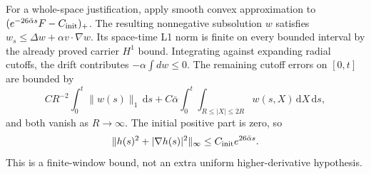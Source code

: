 \documentclass[11pt]{article}
\numberwithin{equation}{section}
\newcommand{\dd}{\,\mathrm d}
\begin{document}
For a whole-space justification, apply smooth convex approximation
to $(e^{-26\bar\alpha s}F-C_{\rm init})_+$. The resulting nonnegative
subsolution $w$ satisfies $w_s\le\Delta w+\alpha v\cdot\nabla w$.
Its space-time L1 norm is finite on every bounded interval by the
already proved carrier $H^1$ bound. Integrating against expanding
radial cutoffs, the drift contributes $-\alpha\int d w\le0$.
The remaining cutoff errors on $[0,t]$ are bounded by
\[
 CR^{-2}\int_0^t\|w(s)\|_1\dd s+
 C\bar\alpha\int_0^t\int_{R\le|X|\le2R}w(s,X)\dd X\dd s,
\]
and both vanish as $R\to\infty$. The initial positive part is zero,
so
\begin{equation}\label{r15:finitesup}
 \|h(s)^2+|\nabla h(s)|^2\|_\infty
 \le C_{\rm init}e^{26\bar\alpha s}.
\end{equation}
This is a finite-window bound, not an extra uniform higher-derivative
hypothesis.
\end{document}
